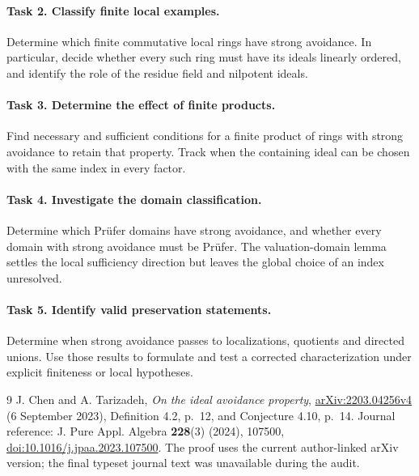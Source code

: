\documentclass[11pt]{article}
\begin{document}
\paragraph{Task 2. Classify finite local examples.}
Determine which finite commutative local rings have strong avoidance.
In particular, decide whether every such ring must have its ideals linearly
ordered, and identify the role of the residue field and nilpotent ideals.

\paragraph{Task 3. Determine the effect of finite products.}
Find necessary and sufficient conditions for a finite product of rings
with strong avoidance to retain that property. Track when the containing
ideal can be chosen with the same index in every factor.

\paragraph{Task 4. Investigate the domain classification.}
Determine which Pr\"ufer domains have strong avoidance, and whether every
domain with strong avoidance must be Pr\"ufer. The valuation-domain lemma
settles the local sufficiency direction but leaves the global choice of
an index unresolved.

\paragraph{Task 5. Identify valid preservation statements.}
Determine when strong avoidance passes to localizations, quotients and
directed unions. Use those results to formulate and test a corrected
characterization under explicit finiteness or local hypotheses.

\begin{thebibliography}{9}
J. Chen and A. Tarizadeh,
\emph{On the ideal avoidance property},
\href{https://arxiv.org/abs/2203.04256v4}{arXiv:2203.04256v4}
(6 September 2023), Definition 4.2, p.~12, and Conjecture 4.10, p.~14.
Journal reference: J. Pure Appl. Algebra \textbf{228}(3) (2024), 107500,
\href{https://doi.org/10.1016/j.jpaa.2023.107500}{doi:10.1016/j.jpaa.2023.107500}.
The proof uses the current author-linked arXiv version; the final typeset
journal text was unavailable during the audit.
\end{thebibliography}
\end{document}
